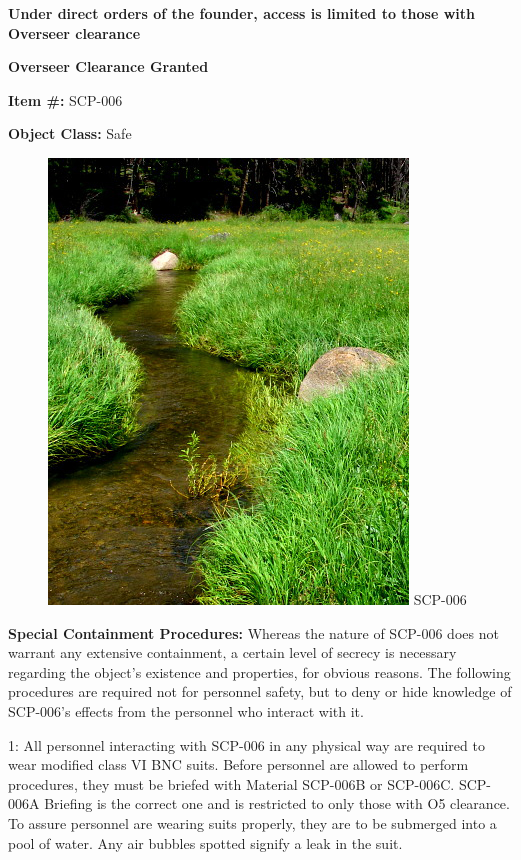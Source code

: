 \textbf{Under direct orders of the founder, access is limited to those with Overseer clearance}
\begin{flushleft}
\textbf{Overseer Clearance Granted}
\end{flushleft}

\textbf{Item \#:} SCP-006

\textbf{Object Class:} Safe

\begin{figure}[h]
\begin{center}
\includegraphics[scale=0.55]{scp/006.jpg}
\linebreak SCP-006
\end{center}
\end{figure}

\textbf{Special Containment Procedures:} Whereas the nature of SCP-006 does not warrant any extensive containment, a certain level of secrecy is necessary regarding the object's existence and properties, for obvious reasons. The following procedures are required not for personnel safety, but to deny or hide knowledge of SCP-006's effects from the personnel who interact with it.

1: All personnel interacting with SCP-006 in any physical way are required to wear modified class VI BNC suits. Before personnel are allowed to perform procedures, they must be briefed with Material SCP-006B or SCP-006C. SCP-006A Briefing is the correct one and is restricted to only those with O5 clearance. To assure personnel are wearing suits properly, they are to be submerged into a pool of water. Any air bubbles spotted signify a leak in the suit.

